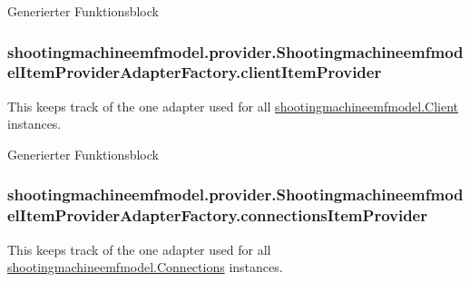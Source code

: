 Generierter Funktionsblock \hypertarget{classshootingmachineemfmodel_1_1provider_1_1_shootingmachineemfmodel_item_provider_adapter_factory_aaea45bbbaaad8f0050b70841d32494f2}{
\subsubsection[{client\-Item\-Provider}]{ shootingmachineemfmodel.\-provider.\-Shootingmachineemfmodel\-Item\-Provider\-Adapter\-Factory.\-client\-Item\-Provider\hspace{0.3cm}{\ttfamily [protected]}}}\label{classshootingmachineemfmodel_1_1provider_1_1_shootingmachineemfmodel_item_provider_adapter_factory_aaea45bbbaaad8f0050b70841d32494f2}
This keeps track of the one adapter used for all \hyperlink{interfaceshootingmachineemfmodel_1_1_client}{shootingmachineemfmodel.\-Client} instances.

Generierter Funktionsblock \hypertarget{classshootingmachineemfmodel_1_1provider_1_1_shootingmachineemfmodel_item_provider_adapter_factory_ab27f91f30f48e178de735cce7a63ac94}{
\subsubsection[{connections\-Item\-Provider}]{ shootingmachineemfmodel.\-provider.\-Shootingmachineemfmodel\-Item\-Provider\-Adapter\-Factory.\-connections\-Item\-Provider\hspace{0.3cm}{\ttfamily [protected]}}}\label{classshootingmachineemfmodel_1_1provider_1_1_shootingmachineemfmodel_item_provider_adapter_factory_ab27f91f30f48e178de735cce7a63ac94}
This keeps track of the one adapter used for all \hyperlink{interfaceshootingmachineemfmodel_1_1_connections}{shootingmachineemfmodel.\-Connections} instances.

